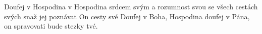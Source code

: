 \begin{TEXT}{Doufej v Hospodina}
\SLOKA* [A.]  v Hospodina  srdcem svým \NL
a  rozumnost svou se  \NL
{} všech cestách svých snaž  jej poznávat \NL
On   cesty své
\SLOKA*  [B.] Doufej v Boha, Hospodina \NL
doufej v Pána, on spravovati bude stezky tvé.
\end{TEXT}
